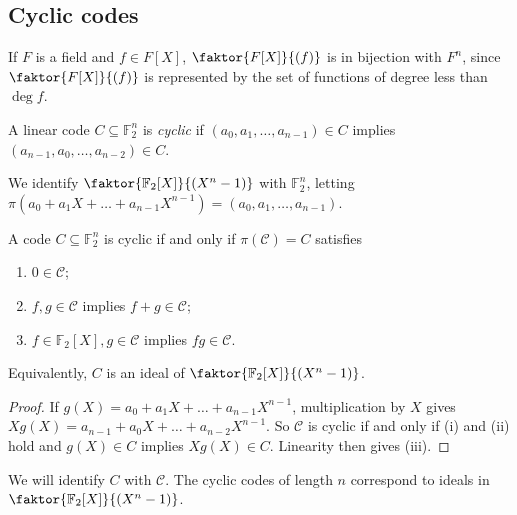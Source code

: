 \subsection{Cyclic codes}
If \( F \) is a field and \( f \in F[X] \), \( \faktor{F[X]}{(f)} \) is in bijection with \( F^n \), since \( \faktor{F[X]}{(f)} \) is represented by the set of functions of degree less than \( \deg f \).
\begin{definition}
    A linear code \( C \subseteq \mathbb F_2^n \) is \emph{cyclic} if \( (a_0, a_1, \dots, a_{n-1}) \in C \) implies \( (a_{n-1}, a_0, \dots, a_{n-2}) \in C \).
\end{definition}
We identify \( \faktor{\mathbb F_2[X]}{(X^n - 1)} \) with \( \mathbb F_2^n \), letting \( \pi(a_0 + a_1X + \dots + a_{n-1}X^{n-1}) = (a_0, a_1, \dots, a_{n-1}) \).
\begin{lemma}
    A code \( C \subseteq \mathbb F_2^n \) is cyclic if and only if \( \pi(\mathcal C) = C \) satisfies
    \begin{enumerate}
        \item \( 0 \in \mathcal C \);
        \item \( f, g \in \mathcal C \) implies \( f + g \in \mathcal C \);
        \item \( f \in \mathbb F_2[X], g \in \mathcal C \) implies \( fg \in \mathcal C \).
    \end{enumerate}
\end{lemma}
Equivalently, \( C \) is an ideal of \( \faktor{\mathbb F_2[X]}{(X^n - 1)} \).
\begin{proof}
    If \( g(X) = a_0 + a_1X + \dots + a_{n-1}X^{n-1} \), multiplication by \( X \) gives \( Xg(X) = a_{n-1} + a_0X + \dots + a_{n-2}X^{n-1} \).
    So \( \mathcal C \) is cyclic if and only if (i) and (ii) hold and \( g(X) \in C \) implies \( Xg(X) \in C \).
    Linearity then gives (iii).
\end{proof}
We will identify \( C \) with \( \mathcal C \).
The cyclic codes of length \( n \) correspond to ideals in \( \faktor{\mathbb F_2[X]}{(X^n - 1)} \).
